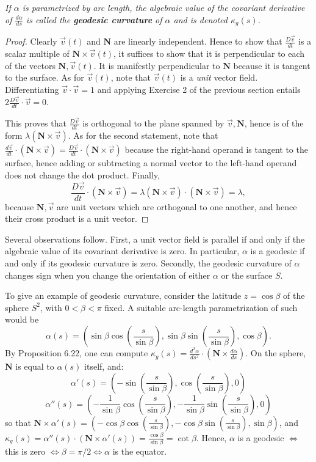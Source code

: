 \documentclass[leqno]{book}
\begin{document}
\emph{If $\alpha$ is parametrized by arc length, the algebraic value of the covariant derivative of $\frac{d\alpha}{ds}$ is called the \textbf{geodesic curvature} of $\alpha$ and is denoted $\kappa_g(s)$.}
\begin{proof}
Clearly $\vec v(t)$ and $\mathbf N$ are linearly independent.  Hence to show that $\frac{D\vec v}{dt}$ is a scalar multiple of $\mathbf N\times\vec v(t)$, it suffices to show that it is perpendicular to each of the vectors $\mathbf N,\vec v(t)$.  It is manifestly perpendicular to $\mathbf N$ because it is tangent to the surface.  As for $\vec v(t)$, note that $\vec v(t)$ is a \emph{unit} vector field.  Differentiating $\vec v\cdot\vec v=1$ and applying Exercise 2 of the previous section entails $2\frac{D\vec v}{dt}\cdot\vec v=0$.

This proves that $\frac{D\vec v}{dt}$ is orthogonal to the plane spanned by $\vec v,\mathbf N$, hence is of the form $\lambda(\mathbf N\times\vec v)$.  As for the second statement, note that $\frac{d\vec v}{dt}\cdot(\mathbf N\times\vec v)=\frac{D\vec v}{dt}\cdot(\mathbf N\times\vec v)$ because the right-hand operand is tangent to the surface, hence adding or subtracting a normal vector to the left-hand operand does not change the dot product.  Finally,
$$\frac{D\vec v}{dt}\cdot(\mathbf N\times\vec v)=\lambda(\mathbf N\times\vec v)\cdot(\mathbf N\times\vec v)=\lambda,$$
because $\mathbf N,\vec v$ are unit vectors which are orthogonal to one another, and hence their cross product is a unit vector.
\end{proof}

\noindent Several observations follow.  First, a unit vector field is parallel if and only if the algebraic value of its covariant derivative is zero.  In particular, $\alpha$ is a geodesic if and only if its geodesic curvature is zero.  Secondly, the geodesic curvature of $\alpha$ changes sign when you change the orientation of either $\alpha$ or the surface $S$.

To give an example of geodesic curvature, consider the latitude $z=\cos\beta$ of the sphere $S^2$, with $0<\beta<\pi$ fixed.  A suitable arc-length parametrization of such would be
$$\alpha(s)=\left(\sin\beta\cos\left(\frac s{\sin\beta}\right),\sin\beta\sin\left(\frac s{\sin\beta}\right),\cos\beta\right).$$
By Proposition 6.22, one can compute $\kappa_g(s)=\frac{d^2\alpha}{ds^2}\cdot\left(\mathbf N\times\frac{d\alpha}{ds}\right)$.  On the sphere, $\mathbf N$ is equal to $\alpha(s)$ itself, and:
$$\alpha'(s)=\left(-\sin\left(\frac s{\sin\beta}\right),\cos\left(\frac s{\sin\beta}\right),0\right)$$
$$\alpha''(s)=\left(-\frac 1{\sin\beta}\cos\left(\frac s{\sin\beta}\right),-\frac 1{\sin\beta}\sin\left(\frac s{\sin\beta}\right),0\right)$$
so that $\mathbf N\times\alpha'(s)=\left(-\cos\beta\cos\left(\frac s{\sin\beta}\right),-\cos\beta\sin\left(\frac s{\sin\beta}\right),\sin\beta \right )$, and $\kappa_g(s)=\alpha''(s)\cdot(\mathbf N\times\alpha'(s))=\frac{\cos\beta}{\sin\beta}=\cot\beta$.  Hence, $\alpha$ is a geodesic $\iff$ this is zero $\iff\beta=\pi/2\iff\alpha$ is the equator.
\end{document}

